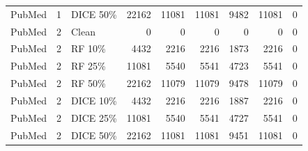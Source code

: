 {\begin{longtable}{lr l rrrrrr}
PubMed & 1 & DICE 50\% & 22162 & 11081 & 11081 & 9482 & 11081 & 0 \\
PubMed & 2 & Clean & 0 & 0 & 0 & 0 & 0 & 0 \\
PubMed & 2 & RF 10\% & 4432 & 2216 & 2216 & 1873 & 2216 & 0 \\
PubMed & 2 & RF 25\% & 11081 & 5540 & 5541 & 4723 & 5541 & 0 \\
PubMed & 2 & RF 50\% & 22162 & 11079 & 11079 & 9478 & 11079 & 0 \\
PubMed & 2 & DICE 10\% & 4432 & 2216 & 2216 & 1887 & 2216 & 0 \\
PubMed & 2 & DICE 25\% & 11081 & 5540 & 5541 & 4727 & 5541 & 0 \\
PubMed & 2 & DICE 50\% & 22162 & 11081 & 11081 & 9451 & 11081 & 0 \\
\end{longtable}
}
